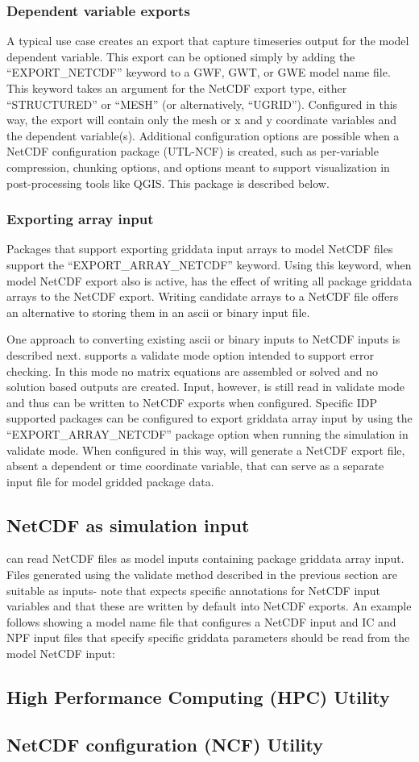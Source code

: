 \subsubsection{Dependent variable exports}
A typical use case creates an export that capture timeseries output for the model dependent variable.  This export can be optioned simply by adding the ``EXPORT\_NETCDF'' keyword to a GWF, GWT, or GWE model name file.  This keyword takes an argument for the NetCDF export type, either ``STRUCTURED'' or ``MESH'' (or alternatively, ``UGRID'').  Configured in this way, the export will contain only the mesh or x and y coordinate variables and the dependent variable(s).  Additional configuration options are possible when a NetCDF configuration package (UTL-NCF) is created, such as per-variable compression, chunking options, and options meant to support visualization in post-processing tools like QGIS.  This package is described below.

\subsubsection{Exporting array input}
Packages that support exporting griddata input arrays to model NetCDF files support the ``EXPORT\_ARRAY\_NETCDF'' keyword.  Using this keyword, when model NetCDF export also is active, has the effect of writing all package griddata arrays to the NetCDF export.  Writing candidate arrays to a NetCDF file offers an alternative to storing them in an ascii or binary input file.

One approach to converting existing ascii or binary inputs to NetCDF inputs is described next.  \mf supports a validate mode option intended to support error checking.  In this mode no matrix equations are assembled or solved and no solution based outputs are created.  Input, however, is still read in validate mode and thus can be written to NetCDF exports when configured. Specific IDP supported packages can be configured to export griddata array input by using the ``EXPORT\_ARRAY\_NETCDF'' package option when running the simulation in validate mode.  When configured in this way, \mf will generate a NetCDF export file, absent a dependent or time coordinate variable, that can serve as a separate input file for model gridded package data.

\subsection{NetCDF as simulation input}
\mf can read NetCDF files as model inputs containing package griddata array input. Files generated using the validate method described in the previous section are suitable as inputs- note that \mf expects specific annotations for NetCDF input variables and that these are written by default into \mf NetCDF exports. An example follows showing a model name file that configures a NetCDF input and IC and NPF input files that specify specific griddata parameters should be read from the model NetCDF input:


\subsection{High Performance Computing (HPC) Utility}


\subsection{NetCDF configuration (NCF) Utility}


